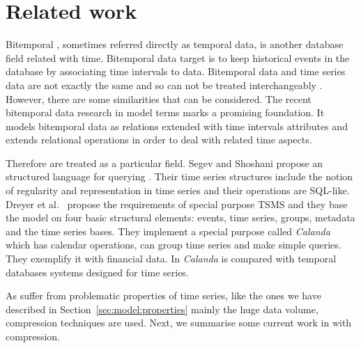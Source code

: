 

\section{Related work}
\label{sec:related-work}

Bitemporal , sometimes referred directly as temporal data,
is another database field related with time. Bitemporal data target is
to keep historical events in the database by associating time
intervals to data.  Bitemporal data and time series data are not
exactly the same and so can not be treated interchangeably
\cite{schmidt95}. However, there are some similarities that can be
considered.  The recent bitemporal data research in  model
terms \cite{jensen99:temporaldata,date02:_tempor_data_relat_model}
marks a promising foundation. It models bitemporal data as relations
extended with time intervals attributes and extends relational
operations in order to deal with related time aspects.


Therefore  are treated as a particular 
field.  Segev and Shoshani \cite{segev87:sigmod} propose an structured
language for querying . Their time series structures
include the notion of regularity and representation in time series and
their operations are SQL-like.  Dreyer et al.\ \cite{dreyer94} propose
the requirements of special purpose TSMS and they base the model on
four basic structural elements: events, time series, groups, metadata
and the time series bases. They implement a special purpose
 called \emph{Calanda} which has calendar operations, can
group time series and make simple queries. They exemplify it with
financial data. In \cite{schmidt95} \emph{Calanda} is compared with
temporal databases systems designed for time series.




As  suffer from problematic properties of time
series, like the ones we have described in
Section~\ref{sec:model:properties} mainly the huge data volume,
compression techniques are used.  Next, we summarise some current work
in  with compression.



